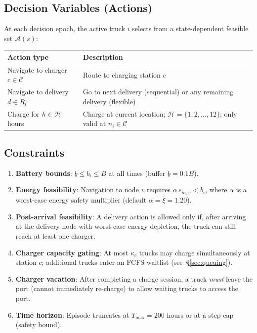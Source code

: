 \documentclass[11pt]{article}
\begin{document}
\subsection{Decision Variables (Actions)}\label{sec:actions}

At each decision epoch, the active truck $i$ selects from a state-dependent feasible set $\mathcal{A}(s)$:
\begin{center}
\begin{tabular}{@{}lp{10cm}@{}}
\toprule
\textbf{Action type} & \textbf{Description} \\
\midrule
Navigate to charger $c\in\mathcal{C}$ & Route to charging station $c$ \\
Navigate to delivery $d\in R_i$ & Go to next delivery (sequential) or any remaining delivery (flexible) \\
Charge for $h\in\mathcal{H}$ hours & Charge at current location; $\mathcal{H}=\{1,2,\dots,12\}$; only valid at $n_i\in\mathcal{C}$ \\
\bottomrule
\end{tabular}
\end{center}

\subsection{Constraints}

\begin{enumerate}[nosep]
    \item \textbf{Battery bounds}: $\underline{b} \le b_i \le B$ at all times (buffer $\underline{b}=0.1B$).
    \item \textbf{Energy feasibility}: Navigation to node $v$ requires $\alpha\, e_{n_i,v} < b_i$, where $\alpha$ is a worst-case energy safety multiplier (default $\alpha = \bar{\xi} = 1.20$).
    \item \textbf{Post-arrival feasibility}: A delivery action is allowed only if, after arriving at the delivery node with worst-case energy depletion, the truck can still reach at least one charger.
    \item \textbf{Charger capacity gating}: At most $\kappa_c$ trucks may charge simultaneously at station $c$; additional trucks enter an FCFS waitlist (see~\S\ref{sec:queuing}).
    \item \textbf{Charger vacation}: After completing a charge session, a truck \emph{must} leave the port (cannot immediately re-charge) to allow waiting trucks to access the port.
    \item \textbf{Time horizon}: Episode truncates at $T_{\max}=200$ hours or at a step cap (safety bound).
\end{enumerate}
\end{document}
